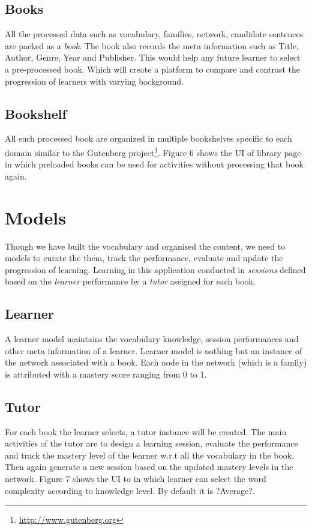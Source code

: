 \documentclass[11pt,a4paper]{article}
\begin{document}
\subsection{Books}

All the processed data such as vocabulary, families, network, candidate sentences
are packed as a \textit{book}. The book also records the meta information such as
Title, Author, Genre, Year and Publisher. This would help any future learner to select a pre-processed book. Which will create a platform to compare and contrast the progression of learners with varying background.

\subsection{Bookshelf}
All such processed book are organized in multiple bookshelves specific to each
domain similar to the Gutenberg project\footnote{\url{http://www.gutenberg.org}}. Figure 6 shows the UI of library page in which preloaded books can be used for activities without processing that book again.

\section{Models}
Though we have built the vocabulary and organised the content, we need to models to curate the them, track the performance, evaluate and update the progression of learning. Learning in this application conducted in \textit{sessions} defined based on the \textit{learner} performance by a \textit{tutor} assigned for each book.

\subsection{Learner}
A learner model maintains the vocabulary knowledge, session performances and other meta information of a learner. Learner model is nothing but an instance of the network associated with a book. Each node in the network (which is a family) is attributed with a mastery score ranging from 0 to 1.

\subsection{Tutor}
For each book the learner selects, a tutor instance will be created. The main
activities of the tutor are to design a learning session, evaluate the
performance and track the mastery level of the learner w.r.t all the vocabulary
in the book. Then again generate a new session based on the updated mastery
levels in the network. Figure 7 shows the UI to in which learner can select the word 
complexity according to knowledge level. By default it is ?Average?.
\end{document}

